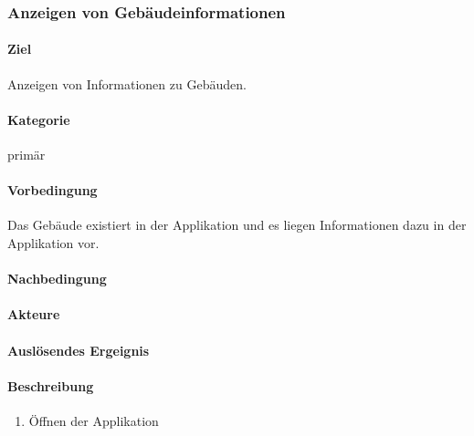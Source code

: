 \subsubsection{Anzeigen von Gebäudeinformationen}
\label{Anzeigen von Gebäudeinformationen}
\paragraph{Ziel}
Anzeigen von Informationen zu Gebäuden.
\paragraph{Kategorie}
primär
\paragraph{Vorbedingung}
Das Gebäude existiert in der Applikation und es liegen Informationen dazu in der Applikation vor.
\paragraph{Nachbedingung}

\paragraph{Akteure}

\paragraph{Auslösendes Ergeignis}

\paragraph{Beschreibung}
\begin{enumerate}
    \item Öffnen der Applikation
\end{enumerate}